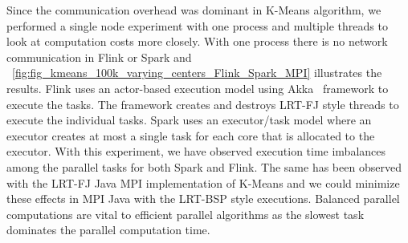 \documentclass[10pt, conference, compsocconf]{IEEEtran}
\begin{document}
Since the communication overhead was dominant in K-Means algorithm, we performed a single node experiment with one process and multiple threads to look at computation costs more closely. With one process there is no network communication in Flink or Spark and \figurename~\ref{fig:fig_kmeans_100k_varying_centers_Flink_Spark_MPI} illustrates the results. Flink uses an actor-based execution model using Akka~\cite{gupta2012akka} framework to execute the tasks. The framework creates and destroys \ac{LRT-FJ} style threads to execute the individual tasks. Spark uses an executor/task model where an executor creates at most a single task for each core that is allocated to the executor. With this experiment, we have observed execution time imbalances among the parallel tasks for both Spark and Flink. The same has been observed with the \ac{LRT-FJ} Java \ac{MPI} implementation of K-Means and we could minimize these effects in \ac{MPI} Java with the \ac{LRT-BSP} style executions. Balanced parallel computations are vital to efficient parallel algorithms as the slowest task dominates the parallel computation time. 

\end{document}
